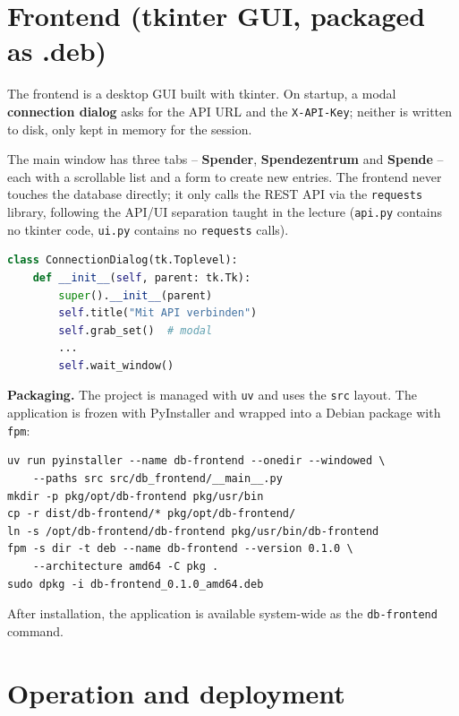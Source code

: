 \documentclass[11pt,a4paper]{article}
\begin{document}
\section{Frontend (tkinter GUI, packaged as .deb)}

The frontend is a desktop GUI built with tkinter. On startup, a modal
\textbf{connection dialog} asks for the API URL and the \texttt{X-API-Key};
neither is written to disk, only kept in memory for the session.

The main window has three tabs -- \textbf{Spender}, \textbf{Spendezentrum}
and \textbf{Spende} -- each with a scrollable list and a form to create new
entries. The frontend never touches the database directly; it only calls
the REST API via the \texttt{requests} library, following the API/UI
separation taught in the lecture (\texttt{api.py} contains no tkinter code,
\texttt{ui.py} contains no \texttt{requests} calls).

\begin{lstlisting}[language=Python, caption={Connection dialog (excerpt)}]
class ConnectionDialog(tk.Toplevel):
    def __init__(self, parent: tk.Tk):
        super().__init__(parent)
        self.title("Mit API verbinden")
        self.grab_set()  # modal
        ...
        self.wait_window()
\end{lstlisting}

\textbf{Packaging.} The project is managed with \texttt{uv} and uses the
\texttt{src} layout. The application is frozen with PyInstaller and wrapped
into a Debian package with \texttt{fpm}:

\begin{lstlisting}[caption={Building and installing the .deb}]
uv run pyinstaller --name db-frontend --onedir --windowed \
    --paths src src/db_frontend/__main__.py
mkdir -p pkg/opt/db-frontend pkg/usr/bin
cp -r dist/db-frontend/* pkg/opt/db-frontend/
ln -s /opt/db-frontend/db-frontend pkg/usr/bin/db-frontend
fpm -s dir -t deb --name db-frontend --version 0.1.0 \
    --architecture amd64 -C pkg .
sudo dpkg -i db-frontend_0.1.0_amd64.deb
\end{lstlisting}

After installation, the application is available system-wide as the
\texttt{db-frontend} command.

\section{Operation and deployment}
\end{document}
